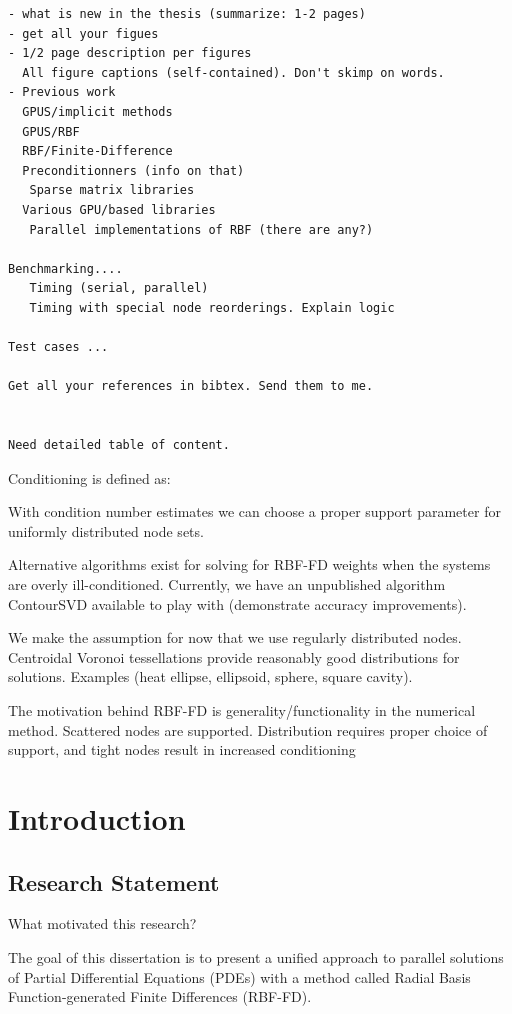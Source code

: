 
\begin{verbatim}
- what is new in the thesis (summarize: 1-2 pages)
- get all your figues
- 1/2 page description per figures
  All figure captions (self-contained). Don't skimp on words.
- Previous work
  GPUS/implicit methods
  GPUS/RBF
  RBF/Finite-Difference
  Preconditionners (info on that)
   Sparse matrix libraries
  Various GPU/based libraries
   Parallel implementations of RBF (there are any?)

Benchmarking....
   Timing (serial, parallel)
   Timing with special node reorderings. Explain logic

Test cases ...

Get all your references in bibtex. Send them to me.


Need detailed table of content.
 \end{verbatim}		

Conditioning is defined as: 

With condition number estimates we can choose a proper support parameter for uniformly distributed node sets.

Alternative algorithms exist for solving for RBF-FD weights when the systems are overly ill-conditioned. Currently, we have an unpublished algorithm ContourSVD available to play with (demonstrate accuracy improvements). 

We make the assumption for now that we use regularly distributed nodes. Centroidal Voronoi tessellations provide reasonably good distributions for solutions. Examples (heat ellipse, ellipsoid, sphere, square cavity).

The motivation behind RBF-FD is generality/functionality in the numerical method. Scattered nodes are supported. Distribution requires proper choice of support, and tight nodes result in increased conditioning


\chapter{Introduction}

\section{Research Statement} 
What motivated this research?
\label{sec:intro}

The goal of this dissertation is to present a unified approach
to parallel solutions of Partial Differential Equations (PDEs)
with a method called Radial Basis Function-generated Finite
Differences (RBF-FD).

